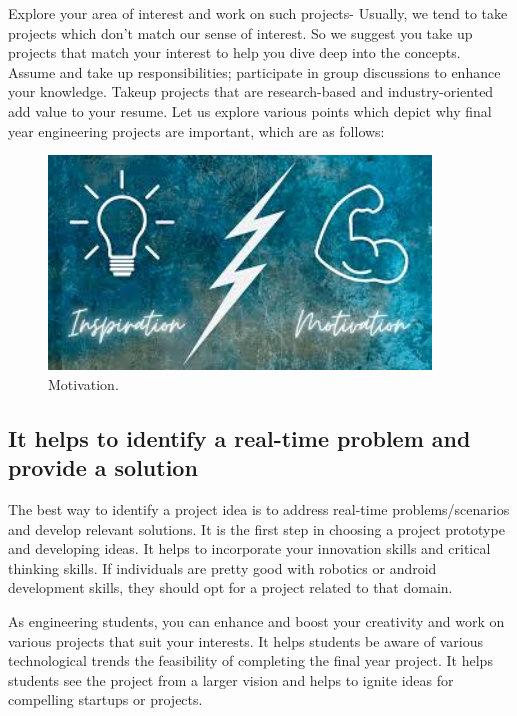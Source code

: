 Explore your area of interest and work on such projects- Usually, we tend to take projects which don’t match our sense of interest. So we suggest you take up projects that match your interest to help you dive deep into the concepts.
Assume and take up responsibilities; participate in group discussions to enhance your knowledge.
Takeup projects that are research-based and industry-oriented add value to your resume.
Let us explore various points which depict why final year engineering projects are important, which are as follows:

\begin{figure}[ht]
	\centering
	\includegraphics[width=4in]{figures/motivation.jpg}
	\caption{Motivation.  \label{fig:motivation}}
\end{figure}

%
\subsection{It helps to identify a real-time problem and provide a solution}
The best way to identify a project idea is to address real-time problems/scenarios and develop relevant solutions. It is the first step in choosing a project prototype and developing ideas. It helps to incorporate your innovation skills and critical thinking skills. If individuals are pretty good with robotics or android development skills, they should opt for a project related to that domain.

As engineering students, you can enhance and boost your creativity and work on various projects that suit your interests. It helps students be aware of various technological trends the feasibility of completing the final year project. It helps students see the project from a larger vision and helps to ignite ideas for compelling startups or projects.


